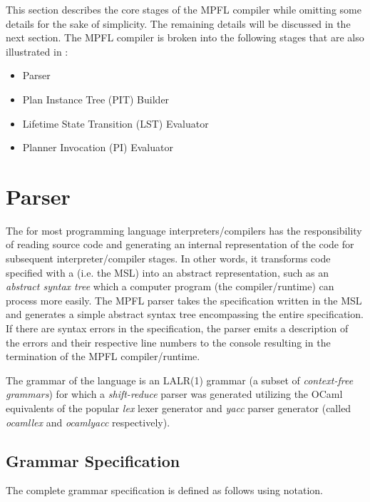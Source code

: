 This section describes the core stages of the MPFL compiler while omitting some details for the sake of simplicity. The remaining details will be discussed in the next section. The MPFL compiler is broken into the following stages that are also illustrated in :
\begin{itemize}
\item Parser
\item Plan Instance Tree (PIT) Builder
\item Lifetime State Transition (LST) Evaluator
\item Planner Invocation (PI) Evaluator
\end{itemize}

\section{Parser}
The  for most programming language interpreters/compilers has the responsibility of reading source code and generating an internal representation of the code for subsequent interpreter/compiler stages. In other words, it transforms code specified with a  (i.e. the MSL) into an abstract representation, such as an \textit{abstract syntax tree} which a computer program (the compiler/runtime) can process more easily. The MPFL parser takes the specification written in the MSL and generates a simple abstract syntax tree encompassing the entire specification. If there are syntax errors in the specification, the parser emits a description of the errors and their respective line numbers to the console resulting in the termination of the MPFL compiler/runtime.

The grammar of the language is an LALR(1) grammar (a subset of \textit{context-free grammars}) for which a \textit{shift-reduce} parser was generated utilizing the OCaml equivalents of the popular \textit{lex} lexer generator and \textit{yacc} parser generator (called \textit{ocamllex} and \textit{ocamlyacc} respectively). 

\subsection{Grammar Specification}
The complete grammar specification is defined as follows using  notation.

